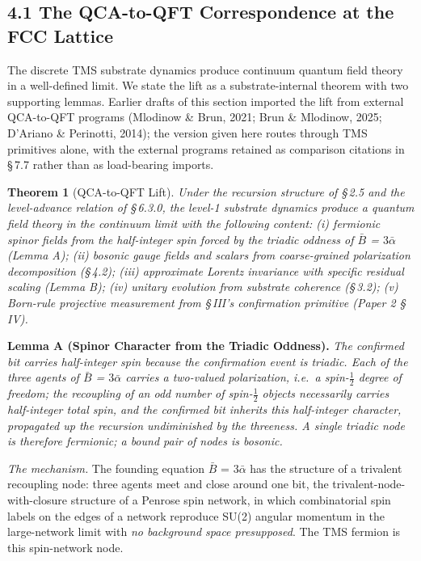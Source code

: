 \documentclass[11pt,oneside]{report}
\newtheorem{theorem}{Theorem}[section]
\theoremstyle{definition}
\theoremstyle{remark}
\begin{document}
\subsection*{4.1 The QCA-to-QFT Correspondence at the FCC Lattice}

The discrete TMS substrate dynamics produce continuum quantum field
theory in a well-defined limit. We state the lift as a
substrate-internal theorem with two supporting lemmas. Earlier drafts of
this section imported the lift from external QCA-to-QFT programs
(Mlodinow \& Brun, 2021; Brun \& Mlodinow, 2025; D'Ariano \& Perinotti,
2014); the version given here routes through TMS primitives alone, with
the external programs retained as comparison citations in \S\,7.7 rather
than as load-bearing imports.

\begin{theorem}[QCA-to-QFT Lift]
Under the recursion structure
of \S\,2.5 and the level-advance relation of \S\,6.3.0, the level-1 substrate
dynamics produce a quantum field theory in the continuum limit with the
following content: (i) fermionic spinor fields from the half-integer spin
forced by the triadic oddness of \ensuremath{\bar{B}} = \ensuremath{3\bar{\alpha}} (Lemma A); (ii)
bosonic gauge fields and scalars from coarse-grained polarization
decomposition (\S\,4.2); (iii) approximate Lorentz invariance with specific
residual scaling (Lemma B); (iv) unitary evolution from substrate
coherence (\S\,3.2); (v) Born-rule projective measurement from \S\,III's
confirmation primitive (Paper 2 \S\,IV).
\end{theorem}

\textbf{Lemma A (Spinor Character from the Triadic Oddness).} \emph{The
confirmed bit carries half-integer spin because the confirmation event is
triadic. Each of the three agents of \ensuremath{\bar{B}} = \ensuremath{3\bar{\alpha}} carries a two-valued
polarization, i.e.~a spin-\ensuremath{\tfrac{1}{2}} degree of freedom; the recoupling of an
odd number of spin-\ensuremath{\tfrac{1}{2}} objects necessarily carries half-integer total
spin, and the confirmed bit inherits this half-integer character,
propagated up the recursion undiminished by the threeness. A single
triadic node is therefore fermionic; a bound pair of nodes is bosonic.}

\emph{The mechanism.} The founding equation \ensuremath{\bar{B}} = \ensuremath{3\bar{\alpha}} has the
structure of a trivalent recoupling node: three agents meet and close
around one bit, the trivalent-node-with-closure structure of a Penrose
spin network, in which combinatorial spin labels on the edges of a
network reproduce SU(2) angular momentum in the large-network limit with
\emph{no background space presupposed}. The TMS fermion is this
spin-network node.
\end{document}
